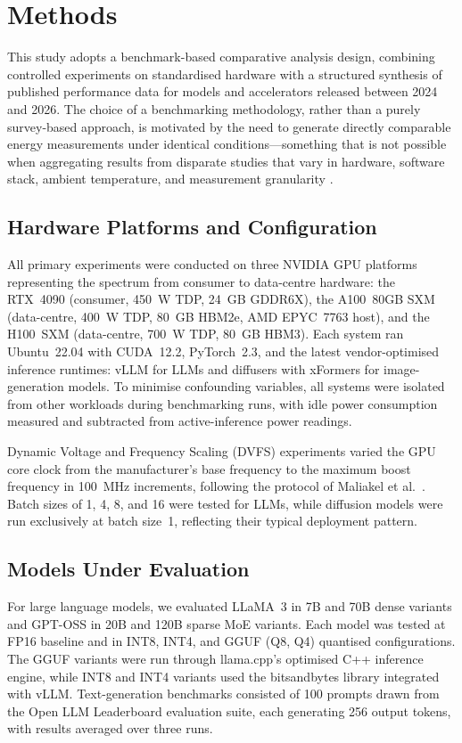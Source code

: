 \documentclass[AMS,STIX2COL]{WileyNJD-v2}
\begin{document}
\section{Methods}\label{sec3}

This study adopts a benchmark-based comparative analysis design, combining controlled experiments on standardised hardware with a structured synthesis of published performance data for models and accelerators released between 2024 and 2026. The choice of a benchmarking methodology, rather than a purely survey-based approach, is motivated by the need to generate directly comparable energy measurements under identical conditions---something that is not possible when aggregating results from disparate studies that vary in hardware, software stack, ambient temperature, and measurement granularity \cite{yang2025system}.

\subsection{Hardware Platforms and Configuration}

All primary experiments were conducted on three NVIDIA GPU platforms representing the spectrum from consumer to data-centre hardware: the RTX~4090 (consumer, 450~W TDP, 24~GB GDDR6X), the A100~80GB SXM (data-centre, 400~W TDP, 80~GB HBM2e, AMD EPYC~7763 host), and the H100~SXM (data-centre, 700~W TDP, 80~GB HBM3). Each system ran Ubuntu~22.04 with CUDA~12.2, PyTorch~2.3, and the latest vendor-optimised inference runtimes: vLLM for LLMs and diffusers with xFormers for image-generation models. To minimise confounding variables, all systems were isolated from other workloads during benchmarking runs, with idle power consumption measured and subtracted from active-inference power readings.

Dynamic Voltage and Frequency Scaling (DVFS) experiments varied the GPU core clock from the manufacturer's base frequency to the maximum boost frequency in 100~MHz increments, following the protocol of Maliakel et al.\ \cite{maliakel2025dvfs}. Batch sizes of 1, 4, 8, and 16 were tested for LLMs, while diffusion models were run exclusively at batch size~1, reflecting their typical deployment pattern.

\subsection{Models Under Evaluation}

For large language models, we evaluated LLaMA~3 in 7B and 70B dense variants \cite{grattafiori2024llama3} and GPT-OSS in 20B and 120B sparse MoE variants. Each model was tested at FP16 baseline and in INT8, INT4, and GGUF (Q8, Q4) quantised configurations. The GGUF variants were run through llama.cpp's optimised C++ inference engine, while INT8 and INT4 variants used the bitsandbytes library integrated with vLLM. Text-generation benchmarks consisted of 100 prompts drawn from the Open LLM Leaderboard evaluation suite, each generating 256 output tokens, with results averaged over three runs.
\end{document}
